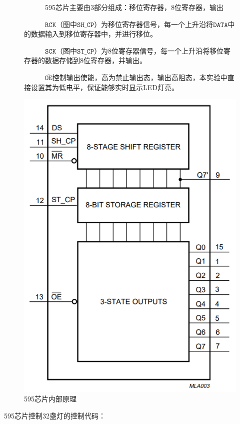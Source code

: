 \documentclass{article}
\begin{document}
\begin{figure}[H]
    \begin{minipage}{0.69\textwidth}
\ \ \ \ \ \ 595芯片主要由3部分组成：移位寄存器，8位寄存器，输出\par
\ \ \ \ \ \ $\texttt{RCK}$（图中$\texttt{SH\_CP}$）为移位寄存器信号，每一个上升沿将$\texttt{DATA}$中的数据输入到移位寄存器中，并进行移位。\par
\ \ \ \ \ \ $\texttt{SCK}$（图中$\texttt{ST\_CP}$）为8位寄存器信号，每一个上升沿将移位寄存器的数据存储到8位寄存器，并输出。\par
\ \ \ \ \ \ $\overline{\texttt{OE}}$控制输出使能，高为禁止输出态，输出高阻态，本实验中直接设置其为低电平，保证能够实时显示LED灯亮。\par
    \end{minipage}
    \begin{minipage}{0.3\textwidth}
        \centering
        \includegraphics[width=0.8\linewidth]{assets/2.png}
        \caption{595芯片内部原理}
    \end{minipage}
\end{figure}
595芯片控制32盏灯的控制代码：
\end{document}
